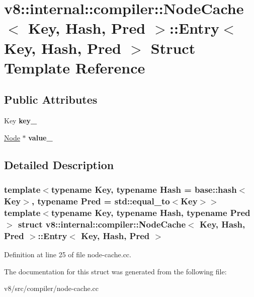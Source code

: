 \hypertarget{structv8_1_1internal_1_1compiler_1_1NodeCache_1_1Entry}{}\section{v8\+:\+:internal\+:\+:compiler\+:\+:Node\+Cache$<$ Key, Hash, Pred $>$\+:\+:Entry$<$ Key, Hash, Pred $>$ Struct Template Reference}
\label{structv8_1_1internal_1_1compiler_1_1NodeCache_1_1Entry}
\subsection*{Public Attributes}
\begin{DoxyCompactItemize}
\item 
\mbox{\label{structv8_1_1internal_1_1compiler_1_1NodeCache_1_1Entry_a1ebe5b5a27ec142d7ca1df1e844ecc12}} 
Key {\bfseries key\+\_\+}
\item 
\mbox{\label{structv8_1_1internal_1_1compiler_1_1NodeCache_1_1Entry_a9cd6a26d25cb0fc79edd933de4d1e815}} 
\mbox{\hyperlink{classv8_1_1internal_1_1compiler_1_1Node}{Node}} $\ast$ {\bfseries value\+\_\+}
\end{DoxyCompactItemize}


\subsection{Detailed Description}
\subsubsection*{template$<$typename Key, typename Hash = base\+::hash$<$\+Key$>$, typename Pred = std\+::equal\+\_\+to$<$\+Key$>$$>$\newline
template$<$typename Key, typename Hash, typename Pred$>$\newline
struct v8\+::internal\+::compiler\+::\+Node\+Cache$<$ Key, Hash, Pred $>$\+::\+Entry$<$ Key, Hash, Pred $>$}



Definition at line 25 of file node-\/cache.\+cc.



The documentation for this struct was generated from the following file\+:\begin{DoxyCompactItemize}
\item 
v8/src/compiler/node-\/cache.\+cc\end{DoxyCompactItemize}

